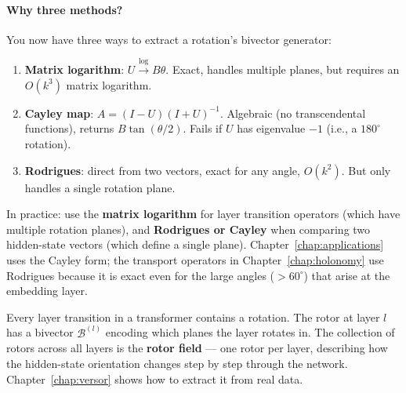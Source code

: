 \documentclass[11pt, twoside, openright]{memoir}
\newcommand{\bivec}[1]{\mathcal{B}^{(#1)}}  %
\numberwithin{equation}{chapter}
\begin{document}
\paragraph{Why three methods?}
You now have three ways to extract a rotation's bivector generator:
\begin{enumerate}[nosep]
\item \textbf{Matrix logarithm}: $U \xrightarrow{\log} B\theta$.  Exact,
  handles multiple planes, but requires an $O(k^3)$ matrix logarithm.
\item \textbf{Cayley map}: $A = (I-U)(I+U)^{-1}$.  Algebraic (no
  transcendental functions), returns $B\tan(\theta/2)$.  Fails if $U$
  has eigenvalue $-1$ (i.e., a $180^\circ$ rotation).
\item \textbf{Rodrigues}: direct from two vectors, exact for any angle,
  $O(k^2)$.  But only handles a single rotation plane.
\end{enumerate}

In practice: use the \textbf{matrix logarithm} for layer transition
operators (which have multiple rotation planes), and
\textbf{Rodrigues or Cayley} when comparing two hidden-state vectors
(which define a single plane).  Chapter~\ref{chap:applications} uses
the Cayley form; the transport operators in
Chapter~\ref{chap:holonomy} use Rodrigues because it is exact even for
the large angles ($>60^\circ$) that arise at the embedding layer.

\begin{transformer}
Every layer transition in a transformer contains a rotation.  The rotor
at layer $l$ has a bivector $\bivec{l}$ encoding which planes the layer
rotates in.  The collection of rotors across all layers is the
\textbf{rotor field} --- one rotor per layer, describing how the
hidden-state orientation changes step by step through the network.
Chapter~\ref{chap:versor} shows how to extract it from real data.
\end{transformer}
\end{document}
